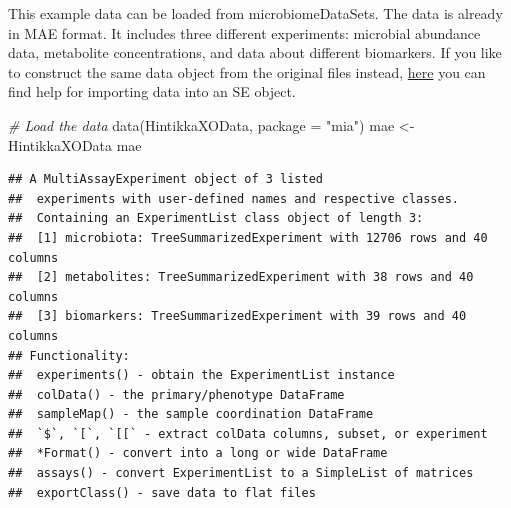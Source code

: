 \documentclass[
]{book}
\newenvironment{Shaded}{\begin{snugshade}}{\end{snugshade}}
\newcommand{\AttributeTok}[1]{\textcolor[rgb]{0.77,0.63,0.00}{#1}}
\newcommand{\CommentTok}[1]{\textcolor[rgb]{0.56,0.35,0.01}{\textit{#1}}}
\newcommand{\DecValTok}[1]{\textcolor[rgb]{0.00,0.00,0.81}{#1}}
\newcommand{\FunctionTok}[1]{\textcolor[rgb]{0.00,0.00,0.00}{#1}}
\newcommand{\NormalTok}[1]{#1}
\newcommand{\OtherTok}[1]{\textcolor[rgb]{0.56,0.35,0.01}{#1}}
\newcommand{\SpecialCharTok}[1]{\textcolor[rgb]{0.00,0.00,0.00}{#1}}
\newcommand{\StringTok}[1]{\textcolor[rgb]{0.31,0.60,0.02}{#1}}
\begin{document}
This example data can be loaded from microbiomeDataSets. The data is
already in MAE format. It includes three different experiments:
microbial abundance data, metabolite concentrations, and data about
different biomarkers. If you like to construct the same data object from the
original files instead, \href{https://microbiome.github.io/OMA/containers.html\#loading-experimental-microbiome-data}{here}
you can find help for importing data into an SE object.

\begin{Shaded}
\begin{Highlighting}[]
\CommentTok{\# Load the data}
\FunctionTok{data}\NormalTok{(HintikkaXOData, }\AttributeTok{package =} \StringTok{"mia"}\NormalTok{)}
\NormalTok{mae }\OtherTok{\textless{}{-}}\NormalTok{ HintikkaXOData}
\NormalTok{mae}
\end{Highlighting}
\end{Shaded}

\begin{verbatim}
## A MultiAssayExperiment object of 3 listed
##  experiments with user-defined names and respective classes.
##  Containing an ExperimentList class object of length 3:
##  [1] microbiota: TreeSummarizedExperiment with 12706 rows and 40 columns
##  [2] metabolites: TreeSummarizedExperiment with 38 rows and 40 columns
##  [3] biomarkers: TreeSummarizedExperiment with 39 rows and 40 columns
## Functionality:
##  experiments() - obtain the ExperimentList instance
##  colData() - the primary/phenotype DataFrame
##  sampleMap() - the sample coordination DataFrame
##  `$`, `[`, `[[` - extract colData columns, subset, or experiment
##  *Format() - convert into a long or wide DataFrame
##  assays() - convert ExperimentList to a SimpleList of matrices
##  exportClass() - save data to flat files
\end{verbatim}

\begin{Shaded}
\end{Shaded}
\end{document}
